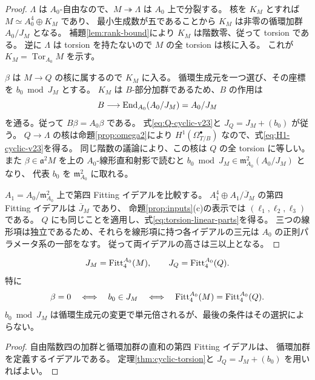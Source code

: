 \begin{proof}
$\Lambda$ は $A_0$-自由なので、$M\twoheadrightarrow\Lambda$ は $A_0$ 上で分裂する。
核を $K_M$ とすれば $M\simeq A_0^4\oplus K_M$ であり、
最小生成数が五であることから $K_M$ は非零の循環加群 $A_0/J_M$ となる。
補題\ref{lem:rank-bound}により $K_M$ は階数零、従って torsion である。
逆に $\Lambda$ は torsion を持たないので $M$ の全 torsion は核に入る。
これが $K_M=\operatorname{Tor}_{A_0}M$ を示す。

$\beta$ は $M\to Q$ の核に属するので $K_M$ に入る。
循環生成元を一つ選び、その座標を $b_0\bmod J_M$ とする。
$K_M$ は $B$-部分加群であるため、$B$ の作用は
\[
 B\longrightarrow\operatorname{End}_{A_0}(A_0/J_M)=A_0/J_M
\]
を通る。従って $B\beta=A_0\beta$ である。
式\eqref{eq:Q-cyclic-v23}と $J_Q=J_M+(b_0)$ が従う。
$Q\to\Lambda$ の核は命題\ref{prop:omega2}により
$H^1(\Omega^\bullet_{T/B})$ なので、式\eqref{eq:H1-cyclic-v23}を得る。
同じ階数の議論により、この核は $Q$ の全 torsion に等しい。
また $\beta\in\mathfrak a^2M$ を上の $A_0$-線形直和射影で読むと
$b_0\bmod J_M\in\mathfrak m_{A_0}^2(A_0/J_M)$ となり、
代表 $b_0$ を $\mathfrak m_{A_0}^2$ に取れる。

$A_1=A_0/\mathfrak m_{A_0}^2$ 上で第四 Fitting イデアルを比較する。
$A_1^4\oplus A_1/\overline J_M$ の第四 Fitting イデアルは $\overline J_M$ であり、
命題\ref{prop:inputs}(c)の表示では $(\ell_1,\ell_2,\ell_3)$ である。
$Q$ にも同じことを適用し、式\eqref{eq:torsion-linear-parts}を得る。
三つの線形項は独立であるため、それらを線形項に持つ各イデアルの三元は
$A_0$ の正則パラメータ系の一部をなす。
従って両イデアルの高さは三以上となる。
\end{proof}

\begin{corollary}\label{cor:intrinsic-fitting}
\[
 J_M=\operatorname{Fitt}_4^{A_0}(M),\qquad J_Q=\operatorname{Fitt}_4^{A_0}(Q).
\]
特に
\begin{equation}\label{eq:beta-fitting-equivalence}
 \beta=0
 \quad\Longleftrightarrow\quad b_0\in J_M
 \quad\Longleftrightarrow\quad
 \operatorname{Fitt}_4^{A_0}(M)=\operatorname{Fitt}_4^{A_0}(Q).
\end{equation}
$b_0\bmod J_M$ は循環生成元の変更で単元倍されるが、最後の条件はその選択によらない。
\end{corollary}

\begin{proof}
自由階数四の加群と循環加群の直和の第四 Fitting イデアルは、
循環加群を定義するイデアルである。
定理\ref{thm:cyclic-torsion}と $J_Q=J_M+(b_0)$ を用いればよい。
\end{proof}

